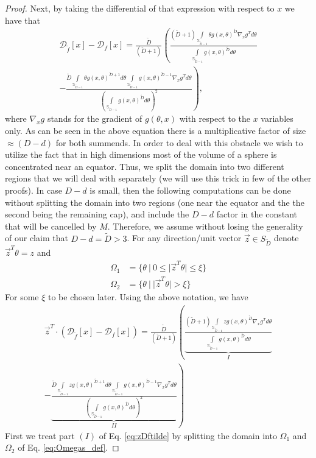 \documentclass[12pt]{article}
\theoremstyle{remark}
\newcommand{\DD}{\mathcal{D}}
\newcommand{\wtilde}[1]{\widetilde{#1}}
\begin{document}
\begin{appendices}
\begin{proof}
Next, by taking the differential of that expression with respect to $x$ we have that 
\begin{multline*}
    \DD_{\wtilde{f}}[x] - \DD_f[x] =
\frac{\wtilde D}{(\wtilde D+1)}\left(
\frac{(\wtilde D+1)\int\limits_{\mathbb{S}_{\wtilde D-1}}\theta g(x,\theta)^{\wtilde D} \nabla_x g^T d\theta}
{\int\limits_{\mathbb{S}_{\wtilde D-1}}g(x,\theta)^{\wtilde D} d\theta} \right.\\
-\left.
\frac{\wtilde D\int\limits_{\mathbb{S}_{\wtilde D-1}}\theta g(x,\theta)^{\wtilde D+1} d\theta \int\limits_{\mathbb{S}_{\wtilde D-1}} g(x,\theta)^{\wtilde D-1}\nabla_x g^T d\theta}
{\left(\int\limits_{\mathbb{S}_{\wtilde D-1}}g(x,\theta)^{\wtilde D} d\theta\right)^2}     
\right)
,\end{multline*}
where $\nabla_x g$ stands for the gradient of $g(\theta, x)$ with respect to the $x$ variables only.
As can be seen in the above equation there is a multiplicative factor of size $\approx (D - d)$ for both summends.
In order to deal with this obstacle we wish to utilize the fact that in high dimensions most of the volume of a sphere is concentrated near an equator.
Thus, we split the domain into two different regions that we will deal with separately (we will use this trick in few of the other proofs). 
In case $D-d$ is small, then the following computations can be done without splitting the domain into two regions (one near the equator and the the second being the remaining cap), and include the $D-d$ factor in the constant that will be cancelled by $M$.
Therefore, we assume without losing the generality of our claim that $D-d = \wtilde D > 3$.
For any direction/unit vector $\vec{z}\in S_{\wtilde D}$ denote $\vec{z}^T\theta = z$ and 
\begin{equation}\label{eq:Omegas_def}
    \begin{aligned}
    \Omega_1 &= \{\theta~|~0\leq |\vec{z}^T\theta| \leq \xi\}\\
    \Omega_2 &= \{\theta~|~|\vec{z}^T\theta| > \xi\}
    \end{aligned}
\end{equation}
For some $\xi$ to be chosen later. Using the above notation, we have 
\begin{multline}\label{eq:zDftilde}
    \vec{z}^T\cdot  (\DD_{\wtilde{f}}[x] - \DD_f[x] )=
\frac{\wtilde D}{(\wtilde D+1)}\left(
\underbrace{\frac{(\wtilde D+1)\int\limits_{\mathbb{S}_{\wtilde D-1}}z g(x,\theta)^{\wtilde D} \nabla_x g^T d\theta}
{\int\limits_{\mathbb{S}_{\wtilde D-1}}g(x,\theta)^{\wtilde D} d\theta}  }_{I} \right.  \\
-\left.
\underbrace{\frac{\wtilde D\int\limits_{\mathbb{S}_{\wtilde D-1}}z g(x,\theta)^{\wtilde D+1} d\theta \int\limits_{\mathbb{S}_{\wtilde D-1}} g(x,\theta)^{\wtilde D-1}\nabla_x g^T d\theta}
{\left(\int\limits_{\mathbb{S}_{\wtilde D-1}}g(x,\theta)^{\wtilde D} d\theta\right)^2}}_{II}     
\right)
\end{multline}
First we treat part $(I)$ of Eq. \eqref{eq:zDftilde} by splitting the domain into $\Omega_1$ and $\Omega_2$ of Eq. \ref{eq:Omegas_def}.


\end{proof}
\end{appendices}
\end{document}
